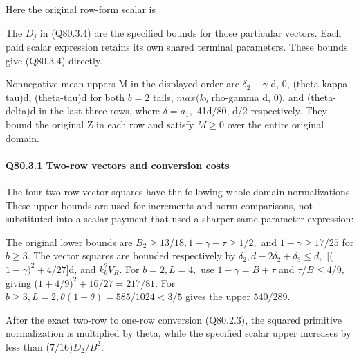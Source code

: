 Here the original row-form scalar is


The \(D_j\) in (Q80.3.4) are the specified bounds for those particular vectors.
Each paid scalar expression retains its own shared terminal parameters.
These bounds give (Q80.3.4) directly.

Nonnegative mean uppers M in the displayed order are
\(\delta_2-\gamma\) d, 0, (theta kappa-tau)d, (theta-tau)d for both \(b=2\) tails,
\(max(k_b\) rho-gamma d, 0), and (theta-delta)d in the last three rows,
where \(\delta=a_1,\allowbreak \) 41d/80, d/2 respectively. They bound the original Z
in each row and satisfy \(M\ge 0\) over the entire original domain.

\paragraph{Q80.3.1 Two-row vectors and conversion costs}

The four two-row vector squares have the following whole-domain
normalizations. These upper bounds are used for increments and norm
comparisons, not substituted into a scalar payment that used a sharper
same-parameter expression:


The original lower bounds are \(B_2\ge 13/18,\allowbreak  1-\gamma-\tau\ge 1/2,\allowbreak \) and \(1-\gamma\ge 17/25\) for \(b\ge 3.\) The vector squares
are bounded respectively by \(\delta_2,\allowbreak  d-2\delta_2+\delta_3\le d,\allowbreak \)
[(\(1-\gamma)^2+4/27\)]d, and \(k_b^2 V_R.\)
For \(b=2,\allowbreak  L=4,\allowbreak \) use \(1-\gamma=B+\tau\) and \(\tau/B\le 4/9,\allowbreak \) giving
(\(1+4/9)^2+16/27=217/81.\) For \(b\ge 3,\allowbreak  L=2,\allowbreak  \theta(1+\theta)=585/1024<3/5\) gives the upper \(540/289.\)

After the exact two-row to one-row conversion (Q80.2.3), the squared
primitive normalization is multiplied by theta, while the specified
scalar upper increases by less than (\(7/16)D_2/B^2.\)

